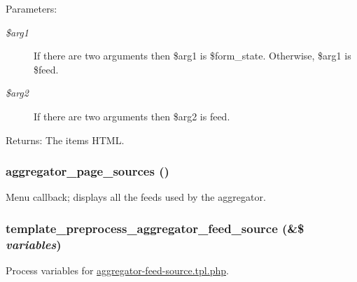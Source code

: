 \begin{Desc}
\item[Parameters:]
\begin{description}
\item[{\em \$arg1}]If there are two arguments then \$arg1 is \$form\_\-state. Otherwise, \$arg1 is \$feed. \item[{\em \$arg2}]If there are two arguments then \$arg2 is feed. \end{description}
\end{Desc}
\begin{Desc}
\item[Returns:]The items HTML. \end{Desc}
\hypertarget{aggregator_8pages_8inc_d0ef3a50612adec65e464214ce643bf6}{
\subsubsection[{aggregator\_\-page\_\-sources}]{\setlength{\rightskip}{0pt plus 5cm}aggregator\_\-page\_\-sources ()}}
\label{aggregator_8pages_8inc_d0ef3a50612adec65e464214ce643bf6}


Menu callback; displays all the feeds used by the aggregator. \hypertarget{aggregator_8pages_8inc_06bc89c22bcd3b3c70c9c1d19391aefc}{
\subsubsection[{template\_\-preprocess\_\-aggregator\_\-feed\_\-source}]{\setlength{\rightskip}{0pt plus 5cm}template\_\-preprocess\_\-aggregator\_\-feed\_\-source (\&\$ {\em variables})}}
\label{aggregator_8pages_8inc_06bc89c22bcd3b3c70c9c1d19391aefc}


Process variables for \hyperlink{aggregator-feed-source_8tpl_8php}{aggregator-feed-source.tpl.php}.

